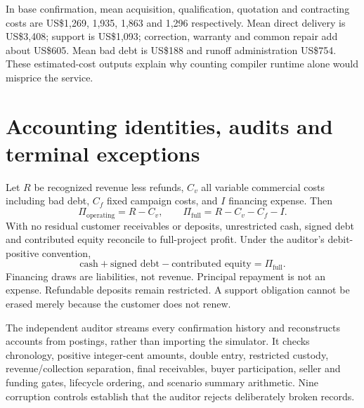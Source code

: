 In base confirmation, mean acquisition, qualification, quotation and contracting costs are US\$1,269, 1,935, 1,863 and 1,296 respectively. Mean direct delivery is US\$3,408; support is US\$1,093; correction, warranty and common repair add about US\$605. Mean bad debt is US\$188 and runoff administration US\$754. These estimated-cost outputs explain why counting compiler runtime alone would misprice the service.

\section{Accounting identities, audits and terminal exceptions}
Let $R$ be recognized revenue less refunds, $C_v$ all variable commercial costs including bad debt, $C_f$ fixed campaign costs, and $I$ financing expense. Then
\begin{equation}
\Pi_{\mathrm{operating}}=R-C_v,\qquad
\Pi_{\mathrm{full}}=R-C_v-C_f-I.
\end{equation}
With no residual customer receivables or deposits, unrestricted cash, signed debt and contributed equity reconcile to full-project profit. Under the auditor's debit-positive convention,
\begin{equation}
\text{cash}+\text{signed debt}-\text{contributed equity}=\Pi_{\mathrm{full}}.
\end{equation}
Financing draws are liabilities, not revenue. Principal repayment is not an expense. Refundable deposits remain restricted. A support obligation cannot be erased merely because the customer does not renew.

The independent auditor streams every confirmation history and reconstructs accounts from postings, rather than importing the simulator. It checks chronology, positive integer-cent amounts, double entry, restricted custody, revenue/collection separation, final receivables, buyer participation, seller and funding gates, lifecycle ordering, and scenario summary arithmetic. Nine corruption controls establish that the auditor rejects deliberately broken records.


